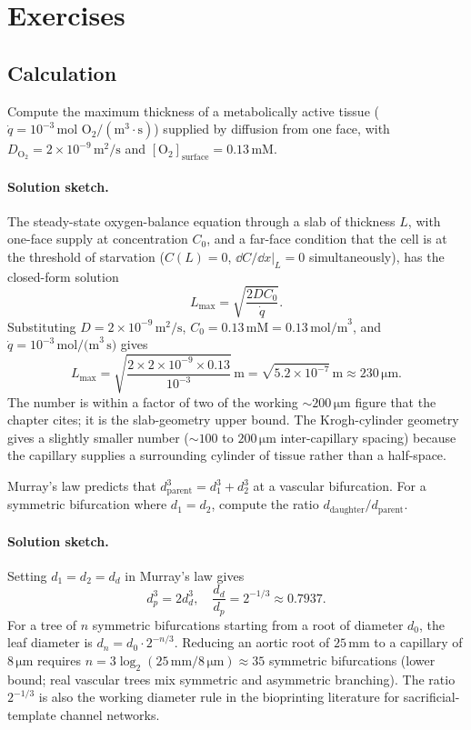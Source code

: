 \section{Exercises}

\subsection*{Calculation}

\begin{exercise}
Compute the maximum thickness of a metabolically active tissue
($\dot{q} = 10^{-3}\,\text{mol O}_2/(\text{m}^3\cdot\text{s})$)
supplied by diffusion from one face, with $D_{\text{O}_2} = 2 \times
10^{-9}\,\text{m}^2/\text{s}$ and $[\text{O}_2]_{\text{surface}} =
0.13\,\text{mM}$.
\end{exercise}

\paragraph{Solution sketch.} The steady-state oxygen-balance equation
through a slab of thickness $L$, with one-face supply at
concentration $C_0$, and a far-face condition that the cell is at
the threshold of starvation ($C(L) = 0$, $\dd C/\dd x|_{L} = 0$
simultaneously), has the closed-form solution
\[
L_{\max} = \sqrt{\frac{2 D C_0}{\dot{q}}}.
\]
Substituting $D = 2 \times 10^{-9}\,\text{m}^2/\text{s}$,
$C_0 = 0.13\,\text{mM} = 0.13\,\text{mol/m}^3$, and
$\dot{q} = 10^{-3}\,\text{mol/(m}^3\,\text{s)}$ gives
\[
L_{\max} = \sqrt{\frac{2 \times 2 \times 10^{-9} \times 0.13}{10^{-3}}}\,\text{m}
        = \sqrt{5.2 \times 10^{-7}}\,\text{m}
        \approx 230\,\si{\micro\meter}.
\]
The number is within a factor of two of the working
$\sim 200\,\si{\micro\meter}$ figure that the chapter cites; it is the
slab-geometry upper bound. The Krogh-cylinder geometry gives a
slightly smaller number ($\sim 100$ to $200\,\si{\micro\meter}$
inter-capillary spacing) because the capillary supplies a surrounding
cylinder of tissue rather than a half-space.

\begin{exercise}
Murray's law predicts that $d_{\text{parent}}^3 = d_1^3 + d_2^3$ at
a vascular bifurcation. For a symmetric bifurcation where
$d_1 = d_2$, compute the ratio $d_{\text{daughter}}/d_{\text{parent}}$.
\end{exercise}

\paragraph{Solution sketch.} Setting $d_1 = d_2 = d_d$ in Murray's
law gives
\[
d_p^3 = 2 d_d^3, \quad
\frac{d_d}{d_p} = 2^{-1/3} \approx 0.7937.
\]
For a tree of $n$ symmetric bifurcations starting from a root of
diameter $d_0$, the leaf diameter is $d_n = d_0 \cdot 2^{-n/3}$.
Reducing an aortic root of $25\,\text{mm}$ to a capillary of
$8\,\si{\micro\meter}$ requires
$n = 3 \log_2(25\,\text{mm}/8\,\si{\micro\meter}) \approx 35$
symmetric bifurcations (lower bound; real vascular trees mix
symmetric and asymmetric branching). The ratio $2^{-1/3}$ is also the
working diameter rule in the bioprinting literature for
sacrificial-template channel networks.

